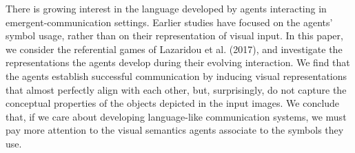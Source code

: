 There is growing interest in the language developed by agents interacting in emergent-communication settings. Earlier studies have focused on the agents' symbol usage, rather than on their representation of visual input. In this paper, we consider the referential games of Lazaridou et al. (2017), and investigate the representations the agents develop during their evolving interaction. We find that the agents establish successful communication by inducing visual representations that almost perfectly align with each other, but, surprisingly, do not capture the conceptual properties of the objects depicted in the input images. We conclude that, if we care about developing language-like communication systems, we must pay more attention to the visual semantics agents associate to the symbols they use.
